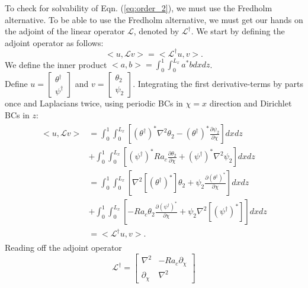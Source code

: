 \documentclass{article}
\newcommand{\pd}[2]{\frac{\partial{#1}}{\partial{#2}}}
\newcommand{\lap}[1]{\nabla^{2}{#1}}
\begin{document}
%
To check for solvability of Eqn. (\ref{eq:order_2}), we must use the Fredholm alternative. To be able to use the Fredholm alternative, we must get our hands on the adjoint of the linear operator $\mathcal{L}$, denoted by $\mathcal{L}^{\dagger}$. We start by defining the adjoint operator as follows:
\begin{equation}
 < u, \mathcal{L} v> = < \mathcal{L}^{\dagger} u, v>.
\end{equation}
We define the inner product $<a, b> = \int_{0}^{1}\int_{0}^{L_{x}}a^{*}b dx dz$.\\
Define $u = \begin{bmatrix}
             \theta^{\dagger}\\
             \psi^{\dagger}
            \end{bmatrix}$
and $v = \begin{bmatrix}
             \theta_{2}\\
             \psi_{2}
            \end{bmatrix}$.
%            
Integrating the first derivative-terms by parts once and Laplacians twice, using periodic BCs in $\chi = x$ direction and Dirichlet BCs in $z$:
\begin{align}\label{eq:Ldagger}
 \begin{split}
  < u, \mathcal{L} v> &= \int_{0}^{1}\int_{0}^{L_{x}} \left[(\theta^{\dagger})^{*}\lap{\theta_{2}} - (\theta^{\dagger})^{*}\pd{\psi_{2}}{\chi} \right] dx dz \\
  & + \int_{0}^{1}\int_{0}^{L_{x}} \left[(\psi^{\dagger})^{*}Ra_{c}\pd{\theta_{2}}{\chi} + (\psi^{\dagger})^{*}\lap{\psi_{2}} \right] dx dz \\
  & = \int_{0}^{1}\int_{0}^{L_{x}} \left[\lap{[(\theta^{\dagger})^{*}]}\theta_{2} + \psi_{2}\pd{(\theta^{\dagger})^{*}}{\chi} \right] dx dz \\
  & + \int_{0}^{1}\int_{0}^{L_{x}} \left[-Ra_{c}\theta_{2}\pd{(\psi^{\dagger})^{*}}{\chi} + \psi_{2}\lap{[(\psi^{\dagger})^{*}]} \right] dx dz \\
  & = < \mathcal{L}^{\dagger} u, v>.
 \end{split}
\end{align}
%
Reading off the adjoint operator 
\begin{equation}
 \boxed{ \mathcal{L}^{\dagger}
 = \begin{bmatrix}
  \lap{} & -Ra_{c}\partial_{\chi} \\
  \partial_{\chi} & \lap{}
 \end{bmatrix}}
\end{equation}
\end{document}
